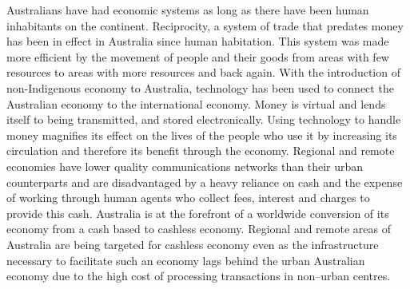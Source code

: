 Australians have had economic systems as long as there have been human inhabitants on the continent. Reciprocity, a system of trade that predates money has been in effect in Australia since human habitation. This system was made more efficient by the movement of people and their goods from areas with few resources to areas with more resources and back again. With the introduction of non-Indigenous economy to Australia, technology has been used to connect the Australian economy to the international economy. Money is virtual and lends itself to being transmitted, and stored electronically. Using technology to handle money magnifies its effect on the lives of the people who use it by increasing its circulation and therefore its benefit through the economy. Regional and remote economies have lower quality communications networks than their urban counterparts and are disadvantaged by a heavy reliance on cash and the expense of working through human agents who collect fees, interest and charges to provide this cash. Australia is at the forefront of a worldwide conversion of its economy from a cash based to cashless economy. Regional and remote areas of Australia are being targeted for cashless economy even as the infrastructure necessary to facilitate such an economy lags behind the urban Australian economy due to the high cost of processing transactions in non--urban centres.

